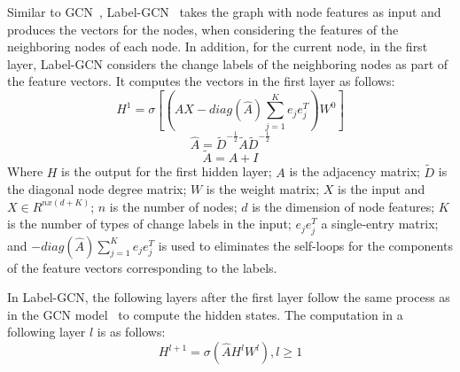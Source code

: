 Similar to GCN~\cite{gcn}, Label-GCN~\cite{label-gcn} takes the graph
with node features as input and produces the vectors for the
nodes, when considering the features of the neighboring nodes of each
node.  In addition, for the current node, in the first layer,
Label-GCN considers the change labels of the neighboring nodes as part
of the feature vectors.
It computes the vectors in the first layer as follows:
\begin{equation}\label{eq1}
	H^1 = \sigma [(\hat{A}X-diag(\hat{A})\sum_{j=1}^{K}e_je^T_j)W^0]
\end{equation}
\begin{equation}\label{eq2}
	\hat{A} = \tilde{D}^{-\frac{1}{2}}\tilde{A}\tilde{D}^{-\frac{1}{2}}
\end{equation}
\begin{equation}\label{eq3}
	\tilde{A} = A + I
\end{equation}
Where $H$ is the output for the first hidden layer; $A$ is the
adjacency matrix; $\tilde{D}$ is the diagonal node degree matrix; $W$
is the weight matrix; $X$ is the input and $X \in R^{nx(d+K)}$; $n$ is
the number of nodes; $d$ is the dimension of node features; $K$ is the
number of types of change labels in the input; $e_je^T_j$ a single-entry
matrix; and $-diag(\hat{A})\sum_{j=1}^{K}e_je^T_j$ is used to
eliminates the self-loops for the components of the feature vectors
corresponding to the labels.


In Label-GCN, the following layers after the first layer follow the
same process as in the GCN model~\cite{gcn} to compute the hidden
states. The computation in a following layer $l$ is as follows:
\begin{equation}\label{eq4}
	H^{l+1} = \sigma (\hat{A}H^lW^l), l \geq 1
\end{equation}

